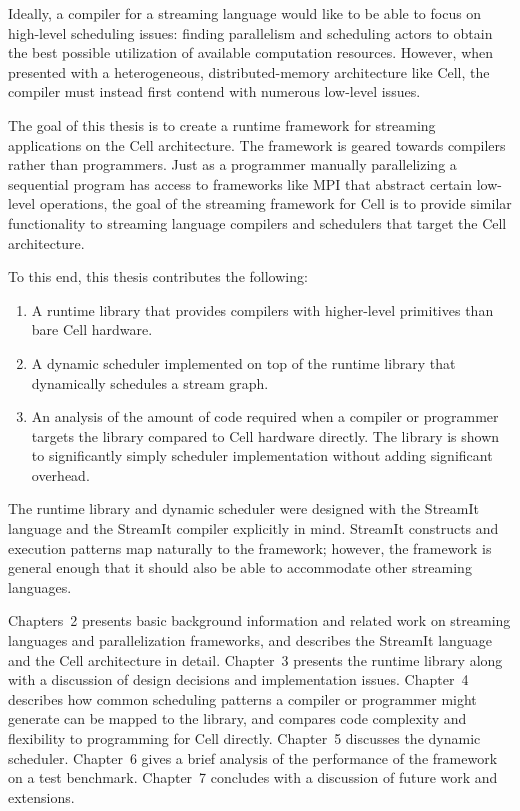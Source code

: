 Ideally, a compiler for a streaming language would like to be able to focus on high-level scheduling issues: finding parallelism and scheduling actors to obtain the best possible utilization of available computation resources. However, when presented with a heterogeneous, distributed-memory architecture like Cell, the compiler must instead first contend with numerous low-level issues.

The goal of this thesis is to create a runtime framework for streaming applications on the Cell architecture. The framework is geared towards compilers rather than programmers. Just as a programmer manually parallelizing a sequential program has access to frameworks like MPI that abstract certain low-level operations, the goal of the streaming framework for Cell is to provide similar functionality to streaming language compilers and schedulers that target the Cell architecture.

To this end, this thesis contributes the following:
\begin{enumerate}
\item A runtime library that provides compilers with higher-level primitives than bare Cell hardware.
\item A dynamic scheduler implemented on top of the runtime library that dynamically schedules a stream graph.
\item An analysis of the amount of code required when a compiler or programmer targets the library compared to Cell hardware directly. The library is shown to significantly simply scheduler implementation without adding significant overhead.
\end{enumerate}

The runtime library and dynamic scheduler were designed with the StreamIt language and the StreamIt compiler explicitly in mind. StreamIt constructs and execution patterns map naturally to the framework; however, the framework is general enough that it should also be able to accommodate other streaming languages.

Chapters~2 presents basic background information and related work on streaming languages and parallelization frameworks, and describes the StreamIt language and the Cell architecture in detail. Chapter~3 presents the runtime library along with a discussion of design decisions and implementation issues. Chapter~4 describes how common scheduling patterns a compiler or programmer might generate can be mapped to the library, and compares code complexity and flexibility to programming for Cell directly. Chapter~5 discusses the dynamic scheduler. Chapter~6 gives a brief analysis of the performance of the framework on a test benchmark. Chapter~7 concludes with a discussion of future work and extensions.
